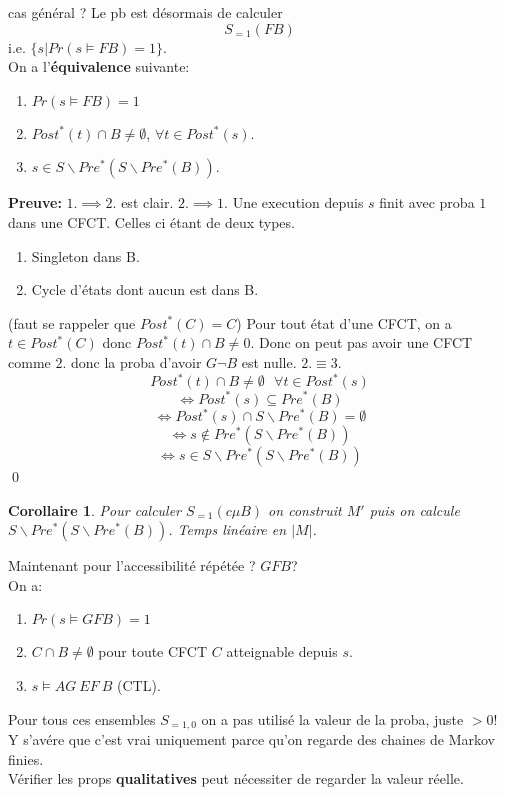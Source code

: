 \documentclass[12pt]{article}
\theoremstyle{plain}
\newtheorem{cor}[subsubsection]{Corollaire}
\theoremstyle{definition}
\theoremstyle{remark}
\begin{document}
cas général ? Le pb est désormais de calculer 
\[S_{=1}(FB)\] i.e. $\{s|Pr(s\vDash FB)=1\}$.\\
\newpage 
\noindent On a l'\textbf{équivalence} suivante:
\begin{enumerate}
    \item $Pr(s\vDash FB)=1$
    \item $Post^*(t)\cap B\ne \emptyset$, $\forall t\in Post^*(s)$.
    \item $s\in S\backslash Pre^*(S\backslash Pre^*(B))$.
\end{enumerate}
\noindent\textbf{Preuve:} $1.\implies 2.$ est clair. 
$2.\implies 1.$ Une execution depuis $s$ finit avec proba 
$1$ dans une CFCT. Celles ci étant de deux types. 
\begin{enumerate}
    \item Singleton dans B.
    \item Cycle d'états dont aucun est dans B.
\end{enumerate}
(faut se rappeler que $Post^*(C)=C$) Pour tout état d'une
CFCT, on a $t\in Post^*(C)$ donc $Post^*(t)\cap B\ne 0$.
Donc on peut pas avoir une CFCT comme $2.$ donc la proba 
d'avoir $G\neg B$ est nulle. $2. \equiv 3.$ 
\[Post^*(t)\cap B\ne \emptyset~~~\forall t\in Post^*(s)\]
\[\Leftrightarrow Post^*(s)\subseteq Pre^*(B)\]
\[\Leftrightarrow Post^*(s)\cap S\backslash Pre^*(B)=\emptyset\]
\[\Leftrightarrow s\notin Pre^*(S\backslash Pre^*(B))\]
\[\Leftrightarrow s\in S\backslash Pre^*(S\backslash Pre^*(B))\]\qed
\begin{cor}
    Pour calculer $S_{=1}(c\mu B)$ on construit $M'$ 
    puis on calcule $S\backslash Pre^*(S\backslash Pre^*(B))$.
    Temps linéaire en $|M|$.
\end{cor}

Maintenant pour l'accessibilité répétée ? $GF B$?\\
On a:
\begin{enumerate}
    \item $Pr(s\vDash GFB)=1$
    \item $C\cap B\ne \emptyset$ pour toute CFCT $C$
    atteignable depuis $s$.
    \item $s\vDash AG~EF~B$ (CTL).
\end{enumerate}
Pour tous ces ensembles $S_{=1,0}$ on a pas utilisé 
la valeur de la proba, juste $>0$! Y s'avére que 
c'est vrai uniquement parce qu'on regarde des chaines 
de Markov finies.\\ \indent Vérifier les props \textbf{qualitatives}
peut nécessiter de regarder la valeur réelle.
\end{document}
